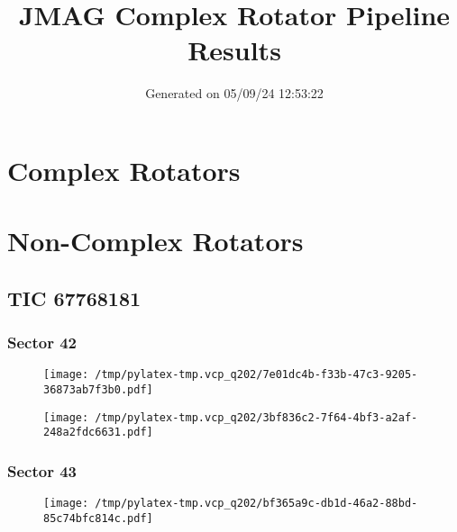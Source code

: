 \documentclass{report}%
\title{JMAG Complex Rotator Pipeline Results}%
\date{Generated on 05/09/24 12:53:22}%
\begin{document}
%
\normalsize%
\maketitle%
\tableofcontents%
\chapter{Complex Rotators}%
\label{chap:ComplexRotators}%

%
\chapter{Non{-}Complex Rotators}%
\label{chap:Non{-}ComplexRotators}%
\section{TIC 67768181}%
\label{sec:TIC67768181}%
\subsection{Sector 42}%
\label{subsec:6776818142}%


\begin{figure}[H]%
\begin{center}%
\centering%
\texttt{[image: /tmp/pylatex-tmp.vcp\_q202/7e01dc4b-f33b-47c3-9205-36873ab7f3b0.pdf]}%
\end{center}%
\end{figure}

%


\begin{figure}[H]%
\begin{center}%
\centering%
\texttt{[image: /tmp/pylatex-tmp.vcp\_q202/3bf836c2-7f64-4bf3-a2af-248a2fdc6631.pdf]}%
\end{center}%
\end{figure}

%
\subsection{Sector 43}%
\label{subsec:6776818143}%


\begin{figure}[H]%
\begin{center}%
\centering%
\texttt{[image: /tmp/pylatex-tmp.vcp\_q202/bf365a9c-db1d-46a2-88bd-85c74bfc814c.pdf]}%
\end{center}%
\end{figure}
\end{document}
